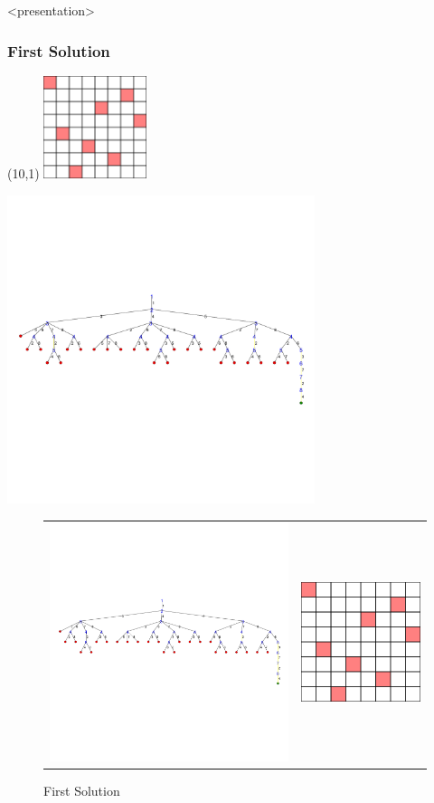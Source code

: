 \begin{frame}<presentation>
\frametitle{First Solution}
\begin{textblock}{4}(10,1)
\includegraphics[width=3cm]{../nqueen/full/frame50}
\end{textblock}
\includegraphics[width=9cm]{../nqueen/full/tree_expanded}
\end{frame}

\begin{figure}[h]
\caption{\label{nqueen:first solution} First Solution}
\begin{center}
\begin{tabular}{cc}
\includegraphics[width=8cm]{../nqueen/full/tree_expanded}
&
\includegraphics[width=4cm]{../nqueen/full/frame50}
\end{tabular}
\end{center}
\end{figure}

